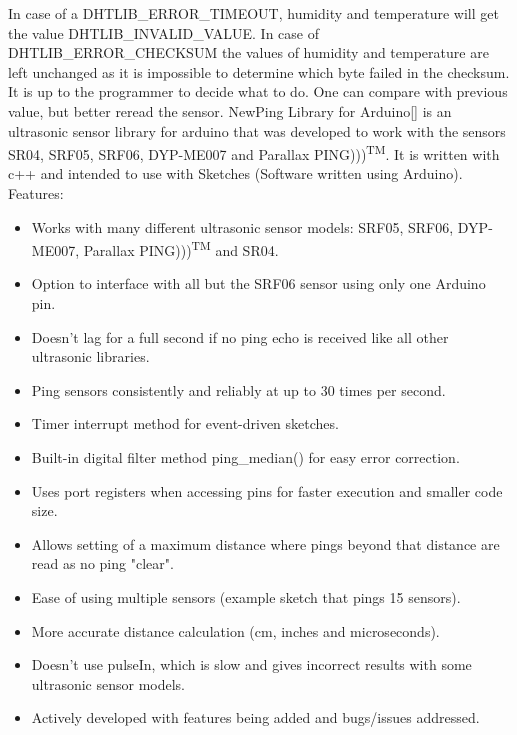 \documentclass{acm_proc_article-sp}
\begin{document}
In case of a DHTLIB\_ERROR\_TIMEOUT, humidity and temperature will get the value DHTLIB\_INVALID\_VALUE. In case of DHTLIB\_ERROR\_CHECKSUM the values of humidity and temperature are left unchanged as it is impossible to determine which byte failed in the checksum. It is up to the programmer to decide what to do. One can compare with previous value, but better reread the sensor.
\newline
\newline
NewPing Library for Arduino[] is an ultrasonic sensor library for arduino that was developed to work with the sensors SR04, SRF05, SRF06, DYP-ME007 and Parallax PING)))\textsuperscript{TM}. It is written with c++ and intended to use with Sketches (Software written using Arduino). 
\newline
\newline
Features:
\begin{itemize}
\item Works with many different ultrasonic sensor models: SRF05, SRF06, DYP-ME007, Parallax PING)))\textsuperscript{TM} and SR04.
\item Option to interface with all but the SRF06 sensor using only one Arduino pin.
\item Doesn't lag for a full second if no ping echo is received like all other ultrasonic libraries.
\item Ping sensors consistently and reliably at up to 30 times per second.
\item Timer interrupt method for event-driven sketches.
\item Built-in digital filter method ping\_median() for easy error correction.
\item Uses port registers when accessing pins for faster execution and smaller code size.
\item Allows setting of a maximum distance where pings beyond that distance are read as no ping "clear".
\item Ease of using multiple sensors (example sketch that pings 15 sensors).
\item More accurate distance calculation (cm, inches and microseconds).
\item Doesn't use pulseIn, which is slow and gives incorrect results with some ultrasonic sensor models.
\item Actively developed with features being added and bugs/issues addressed. 
\end{itemize}
\end{document}
